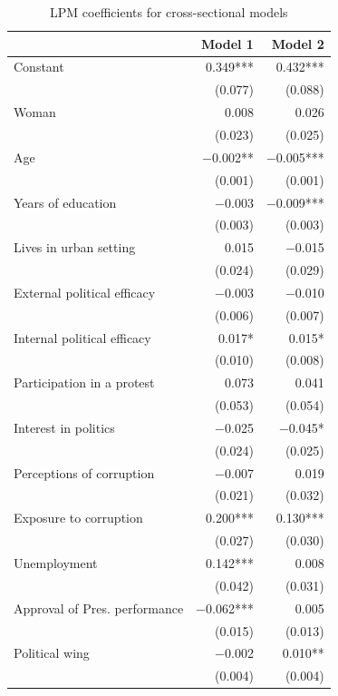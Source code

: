 \documentclass[floatsintext,man]{apa7}\usepackage[]{graphicx}\usepackage[]{color}
\begin{document}
\begin{longtable}[t]{lrr}
\caption{\label{tab:complexmodlpmcross}LPM coefficients for cross-sectional models}\\
\toprule
  & Model 1 & Model 2\\
\midrule
Constant & \num{0.349}*** & \num{0.432}***\\
 & (\num{0.077}) & (\num{0.088})\\
Woman & \num{0.008} & \num{0.026}\\
 & (\num{0.023}) & (\num{0.025})\\
Age & \num{-0.002}** & \num{-0.005}***\\
 & (\num{0.001}) & (\num{0.001})\\
Years of education & \num{-0.003} & \num{-0.009}***\\
 & (\num{0.003}) & (\num{0.003})\\
Lives in urban setting & \num{0.015} & \num{-0.015}\\
 & (\num{0.024}) & (\num{0.029})\\
External political efficacy & \num{-0.003} & \num{-0.010}\\
 & (\num{0.006}) & (\num{0.007})\\
Internal political efficacy & \num{0.017}* & \num{0.015}*\\
 & (\num{0.010}) & (\num{0.008})\\
Participation in a protest & \num{0.073} & \num{0.041}\\
 & (\num{0.053}) & (\num{0.054})\\
Interest in politics & \num{-0.025} & \num{-0.045}*\\
 & (\num{0.024}) & (\num{0.025})\\
Perceptions of corruption & \num{-0.007} & \num{0.019}\\
 & (\num{0.021}) & (\num{0.032})\\
Exposure to corruption & \num{0.200}*** & \num{0.130}***\\
 & (\num{0.027}) & (\num{0.030})\\
Unemployment & \num{0.142}*** & \num{0.008}\\
 & (\num{0.042}) & (\num{0.031})\\
Approval of Pres. performance & \num{-0.062}*** & \num{0.005}\\
 & (\num{0.015}) & (\num{0.013})\\
Political wing & \num{-0.002} & \num{0.010}**\\
 & (\num{0.004}) & (\num{0.004})\\

\end{longtable}
\end{document}
